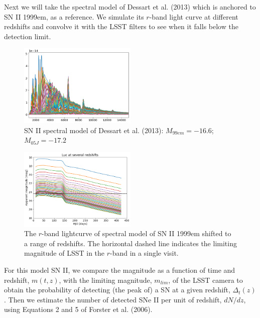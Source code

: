 \documentclass[12pt, onecolumn]{emulateapj}
\begin{document}
Next we will take the spectral model of Dessart et al. (2013) which is anchored to SN II 1999em, as a reference. We simulate its $r$-band light curve at different redshifts and convolve it with the LSST filters to see when it falls below the detection limit.

\begin{figure}
	\begin{center}
		\includegraphics[width=0.5\textwidth]{fig/spectral_model_SNII.png}
		\caption{SN II spectral model of Dessart et al. (2013): $M_{99em}=-16.6$; $M_{05J}=-17.2$}
		\label{fig:SNII_lc}
	\end{center}
\end{figure}

\begin{figure}
	\begin{center}
		\includegraphics[width=0.5\textwidth]{fig/SNII_lc_withz.png}
		\caption{The $r$-band lightcurve of spectral model of SN II 1999em shifted to a range of redshifts. The horizontal dashed line indicates the limiting magnitude of LSST in the $r$-band in a single visit.}
		\label{fig:SNII_lc_withz}
	\end{center}
\end{figure}

For this model SN II, we compare the magnitude as a function of time and redshift, $m(t,z)$, with the limiting magnitude, $m_{lim}$, of the LSST camera to obtain the probability of detecting (the peak of) a SN at a given redshift, $\Delta_{t}(z)$. Then we estimate the number of detected SNe II per unit of redshift, $dN/dz$, using Equations 2 and 5 of Forster et al. (2006).
\end{document}
